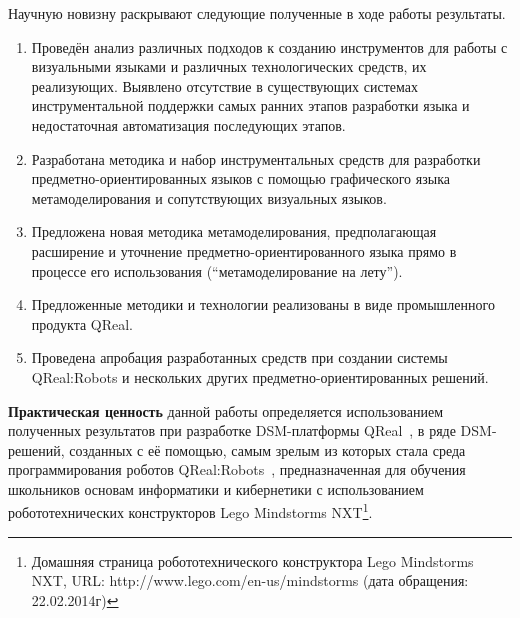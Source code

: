 Научную новизну раскрывают следующие полученные в ходе работы результаты.
\begin{enumerate}
	\item Проведён анализ различных подходов к созданию инструментов для работы с визуальными языками и 
		различных технологических средств, их реализующих. Выявлено отсутствие в существующих
		системах инструментальной поддержки самых ранних этапов разработки языка и недостаточная
		автоматизация последующих этапов.
	\item Разработана методика и набор инструментальных средств для разработки 
		предметно-ориентированных языков с помощью графического языка 
		метамоделирования и сопутствующих визуальных языков.
	\item Предложена новая методика метамоделирования, предполагающая расширение 
		и уточнение предметно-ориентированного языка прямо в процессе его 
		использования ("`метамоделирование на лету"'). 
	\item Предложенные методики и технологии реализованы в виде промышленного 
		продукта QReal.
	\item Проведена апробация разработанных средств при создании системы
		QReal:Robots и нескольких других предметно-ориентированных решений.
\end{enumerate}

\textbf{Практическая ценность} данной работы определяется использованием полученных 
результатов при разработке DSM-платформы QReal~\cite{terekhov2009architecture, kuzenkova2011qreal}, 
в ряде DSM-решений, созданных с её помощью, самым зрелым из которых стала среда программирования 
роботов QReal:Robots~\cite{bryksin2011robots}, предназначенная для обучения 
школьников основам информатики и кибернетики с использованием робототехнических 
конструкторов Lego Mindstorms 
NXT\footnote{Домашняя страница робототехнического конструктора Lego Mindstorms NXT, 
URL: http://www.lego.com/en-us/mindstorms (дата обращения: 22.02.2014г)}.

